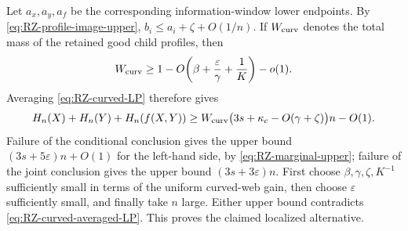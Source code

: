 \documentclass[11pt]{article}
\begin{document}
Let \(a_x,a_y,a_f\) be the corresponding information-window lower
endpoints.  By \eqref{eq:RZ-profile-image-upper},
\(b_i\le a_i+\zeta+O(1/n)\).  If \(W_{\rm curv}\) denotes the
total mass of the retained good child profiles, then
\begin{equation}
 W_{\rm curv}\ge
 1-O\!\left(\beta+\frac{\varepsilon}{\gamma}+\frac{1}{K}\right)-o(1).
 \label{eq:RZ-curved-retained-mass}
\end{equation}
Averaging \eqref{eq:RZ-curved-LP} therefore gives
\begin{equation}
 H_n(X)+H_n(Y)+H_n(f(X,Y))
 \ge W_{\rm curv}
       \bigl(3s+\kappa_c-O(\gamma+\zeta)\bigr)n-O(1).
 \label{eq:RZ-curved-averaged-LP}
\end{equation}
Failure of the conditional conclusion gives the upper bound
\((3s+5\varepsilon)n+O(1)\) for the left-hand side, by
\eqref{eq:RZ-marginal-upper}; failure of the joint conclusion gives
the upper bound \((3s+3\varepsilon)n\).  First choose
\(\beta,\gamma,\zeta,K^{-1}\) sufficiently small in terms of the
uniform curved-web gain, then choose \(\varepsilon\) sufficiently small,
and finally take \(n\) large.  Either upper bound contradicts
\eqref{eq:RZ-curved-averaged-LP}.  This proves the claimed localized
alternative.
\end{document}
